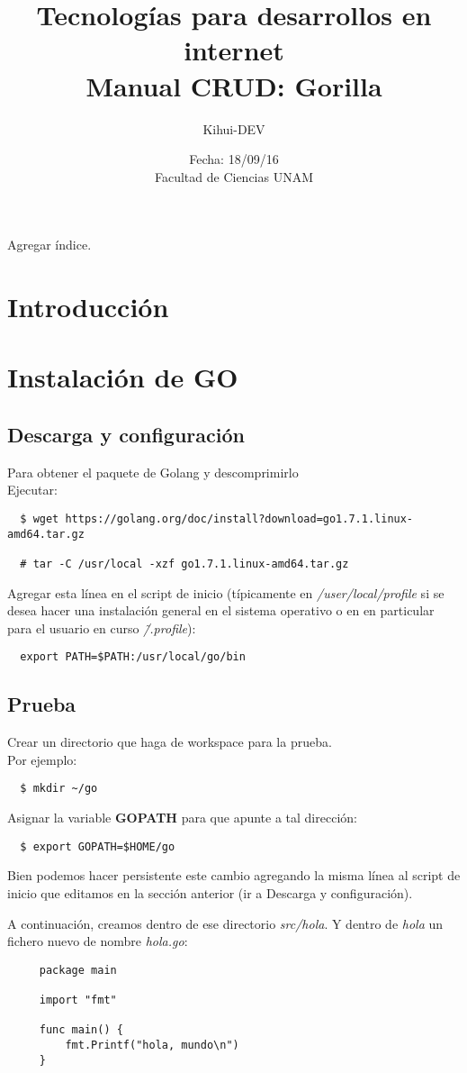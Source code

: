 \documentclass[12pt]{article}
\title{Tecnologías para desarrollos en internet \\ Manual CRUD: Gorilla}
\author{Kihui-DEV}
\date{Fecha: 18/09/16 \\ Facultad de Ciencias UNAM}
\begin{document}
\maketitle
Agregar índice.
\section*{Introducción}
\section*{Instalación de GO}
\subsection*{Descarga y configuración}
Para obtener el paquete de Golang y descomprimirlo \\
Ejecutar:
\begin{verbatim}
  $ wget https://golang.org/doc/install?download=go1.7.1.linux-amd64.tar.gz

  # tar -C /usr/local -xzf go1.7.1.linux-amd64.tar.gz
\end{verbatim}


Agregar esta línea en el script de inicio (típicamente en \textit{/user/local/profile}
si se desea hacer una instalación general en el sistema operativo o
en en particular para el usuario en curso \textit{\~/.profile}):
\begin{verbatim}
  export PATH=$PATH:/usr/local/go/bin
\end{verbatim}

\subsection*{Prueba}
Crear un directorio que haga de workspace para la prueba.\\
Por ejemplo:
\begin{verbatim}
  $ mkdir ~/go
\end{verbatim}
Asignar la variable \textbf{GOPATH} para que apunte a tal dirección:
\begin{verbatim}
  $ export GOPATH=$HOME/go
\end{verbatim}
Bien podemos hacer persistente este cambio agregando la misma línea al script
de inicio que editamos en la sección anterior (ir a Descarga y configuración). \par

A continuación, creamos dentro de ese directorio  \textit{src/hola}.
Y dentro de \textit{hola\/} un fichero nuevo de nombre \textit{hola.go}:
\begin{verbatim}
     package main

     import "fmt"

     func main() {
         fmt.Printf("hola, mundo\n")
     }
\end{verbatim}
\end{document}
